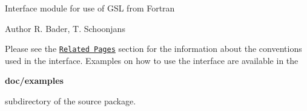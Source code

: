 Interface module for use of G\+S\+L from Fortran \begin{DoxyAuthor}{Author}
R. Bader, T. Schoonjans
\end{DoxyAuthor}
Please see the \href{pages.html}{\tt Related Pages} section for the information about the conventions used in the interface. Examples on how to use the interface are available in the 

{\bfseries doc/examples}

subdirectory of the source package. 
